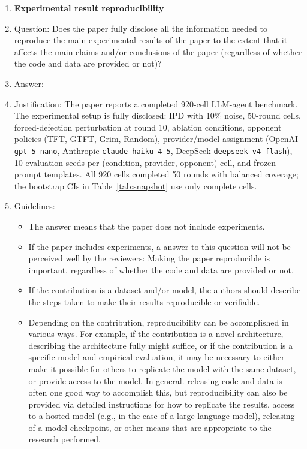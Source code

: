 \begin{enumerate}
    \item {\bf Experimental result reproducibility}
    \item[] Question: Does the paper fully disclose all the information needed to reproduce the main experimental results of the paper to the extent that it affects the main claims and/or conclusions of the paper (regardless of whether the code and data are provided or not)?
    \item[] Answer: \answerYes{}
    \item[] Justification: The paper reports a completed 920-cell LLM-agent benchmark. The experimental setup is fully disclosed: IPD with 10\% noise, 50-round cells, forced-defection perturbation at round 10, ablation conditions, opponent policies (TFT, GTFT, Grim, Random), provider/model assignment (OpenAI \texttt{gpt-5-nano}, Anthropic \texttt{claude-haiku-4-5}, DeepSeek \texttt{deepseek-v4-flash}), 10 evaluation seeds per (condition, provider, opponent) cell, and frozen prompt templates. All 920 cells completed 50 rounds with balanced coverage; the bootstrap CIs in Table~\ref{tab:snapshot} use only complete cells.
    \item[] Guidelines:
    \begin{itemize}
        \item The answer \answerNA{} means that the paper does not include experiments.
        \item If the paper includes experiments, a \answerNo{} answer to this question will not be perceived well by the reviewers: Making the paper reproducible is important, regardless of whether the code and data are provided or not.
        \item If the contribution is a dataset and\slash or model, the authors should describe the steps taken to make their results reproducible or verifiable. 
        \item Depending on the contribution, reproducibility can be accomplished in various ways. For example, if the contribution is a novel architecture, describing the architecture fully might suffice, or if the contribution is a specific model and empirical evaluation, it may be necessary to either make it possible for others to replicate the model with the same dataset, or provide access to the model. In general. releasing code and data is often one good way to accomplish this, but reproducibility can also be provided via detailed instructions for how to replicate the results, access to a hosted model (e.g., in the case of a large language model), releasing of a model checkpoint, or other means that are appropriate to the research performed.

\end{itemize}
\end{enumerate}
